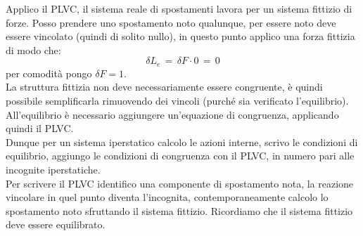 Applico il PLVC, il sistema reale di spostamenti lavora per un sistema fittizio di forze. Posso prendere uno spostamento noto qualunque, per essere noto deve essere vincolato (quindi di solito nullo), in questo punto applico una forza fittizia di modo che:
\begin{equation*}
    \delta L_e \,=\,\delta F\cdot 0 \,=\,0
\end{equation*}
per comodità pongo $\delta F=1$.\\
La struttura fittizia non deve necessariamente essere congruente, è quindi possibile semplificarla rimuovendo dei vincoli (purché sia verificato l'equilibrio).
All'equilibrio è necessario aggiungere un'equazione di congruenza, applicando quindi il PLVC.\\

Dunque per un sistema iperstatico calcolo le azioni interne, scrivo le condizioni di equilibrio, aggiungo le condizioni di congruenza con il PLVC, in numero pari alle incognite iperstatiche.\\
Per scrivere il PLVC identifico una componente di spostamento nota, la reazione vincolare in quel punto diventa l'incognita, contemporaneamente calcolo lo spostamento noto sfruttando il sistema fittizio. Ricordiamo che il sistema fittizio deve essere equilibrato.

    




